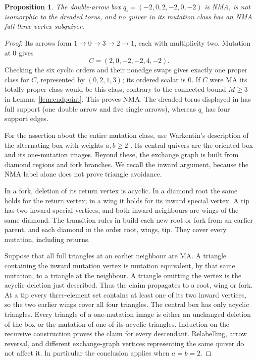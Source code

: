 \documentclass[11pt]{amsart}
\newtheorem{proposition}[theorem]{Proposition}
\theoremstyle{definition}\newtheorem{definition}[theorem]{Definition}
\theoremstyle{remark}\newtheorem{remark}[theorem]{Remark}
\begin{document}
\begin{proposition}\label{prop:box}
The double-arrow box $q_\square=(-2,0,2,-2,0,-2)$ is NMA, is not isomorphic to the dreaded torus, and no quiver in its mutation class has an NMA full three-vertex subquiver.
\end{proposition}
\begin{proof}
Its arrows form $1\to0\to3\to2\to1$, each with multiplicity two. Mutation at $0$ gives
\[
 C=(2,0,-2,-2,4,-2).
\]
Checking the six cyclic orders and their nonedge swaps gives exactly one proper class for $C$, represented by $(0,2,1,3)$; its ordered scalar is $0$. If $C$ were MA its totally proper class would be this class, contrary to the connected bound $M\ge3$ in Lemma~\ref{lem:endpoint}. This proves NMA. The dreaded torus displayed in \cite{AHJL} has full support (one double arrow and five single arrows), whereas $q_\square$ has four support edges.

For the assertion about the entire mutation class, use Warkentin's description of the alternating box with weights $a,b\ge2$ \cite[Example~6.11 and Lemma~6.7]{Warkentin14}. Its central quivers are the oriented box and its one-mutation images. Beyond these, the exchange graph is built from diamond regions and fork branches. We recall the inward argument, because the NMA label alone does not prove triangle avoidance.

In a fork, deletion of its return vertex is acyclic. In a diamond root the same holds for the return vertex; in a wing it holds for its inward special vertex. A tip has two inward special vertices, and both inward neighbours are wings of the same diamond. The transition rules in \cite[Definitions~6.3 and Lemmas~6.4, 6.7]{Warkentin14} build each new root or fork from an earlier parent, and each diamond in the order root, wings, tip. They cover every mutation, including returns.

Suppose that all full triangles at an earlier neighbour are MA. A triangle containing the inward mutation vertex is mutation equivalent, by that same mutation, to a triangle at the neighbour. A triangle omitting the vertex is the acyclic deletion just described. Thus the claim propagates to a root, wing or fork. At a tip every three-element set contains at least one of its two inward vertices, so the two earlier wings cover all four triangles. The central box has only acyclic triangles. Every triangle of a one-mutation image is either an unchanged deletion of the box or the mutation of one of its acyclic triangles. Induction on the recursive construction proves the claim for every descendant. Relabelling, arrow reversal, and different exchange-graph vertices representing the same quiver do not affect it. In particular the conclusion applies when $a=b=2$.
\end{proof}
\end{document}
